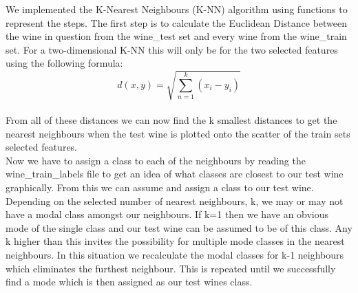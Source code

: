 \documentclass[11pt]{article}
\begin{document}
We implemented the K-Nearest Neighbours (K-NN) algorithm using functions to represent the steps. The first step is to calculate the Euclidean Distance between the wine in question from the wine\_test set and every wine from the wine\_train set. For a two-dimensional K-NN this will only be for the two selected features using the following formula:
$$d(x,y) = \sqrt{\sum_{n=1}^{k} (x_i - y_i)}$$
\\
\noindent
From all of these distances we can now find the k smallest distances to get the nearest neighbours when the test wine is plotted onto the scatter of the train sets selected features.\\

\noindent
Now we have to assign a class to each of the neighbours by reading the wine\_train\_labels file to get an idea of what classes are closest to our test wine graphically. From this we can assume and assign a class to our test wine. Depending on the selected number of nearest neighbours, k, we may or may not have a modal class amongst our neighbours. If k=1 then we have an obvious mode of the single class and our test wine can be assumed to be of this class. Any k higher than this invites the possibility for multiple mode classes in the nearest neighbours. In this situation we recalculate the modal classes for k-1 neighbours which eliminates the furthest neighbour. This is repeated until we successfully find a mode which is then assigned as our test wines class.\\
\end{document}
